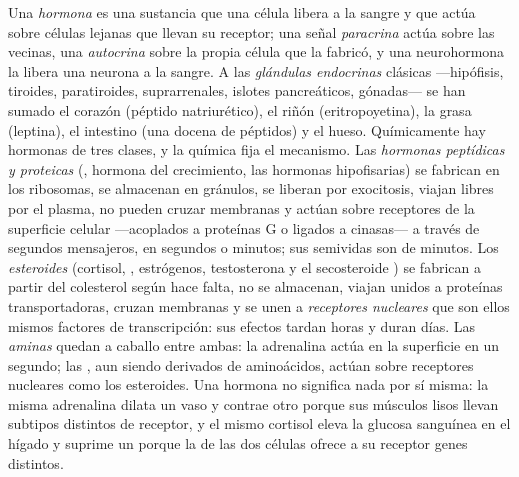 \begin{definition}[Hormona]\label{def:b3:endocrinology:hormone}
Una \emph{hormona} es una sustancia que una célula libera a la sangre y
que actúa sobre células lejanas que llevan su receptor; una señal
\emph{paracrina} actúa sobre las vecinas, una \emph{autocrina} sobre la
propia célula que la fabricó, y una neurohormona la libera una neurona
a la sangre. A las \emph{glándulas endocrinas} clásicas ---hipófisis,
tiroides, paratiroides, suprarrenales, islotes pancreáticos, gónadas---
se han sumado el corazón (péptido natriurético), el riñón
(eritropoyetina), la grasa (leptina), el intestino (una docena de
péptidos) y el hueso. Químicamente hay hormonas de tres clases, y la
química fija el mecanismo. Las \emph{hormonas peptídicas y proteicas}
(, hormona del crecimiento, las hormonas hipofisarias) se
fabrican en los ribosomas, se almacenan en gránulos, se liberan por
exocitosis, viajan libres por el plasma, no pueden cruzar membranas y
actúan sobre receptores de la superficie celular ---acoplados a
proteínas G o ligados a cinasas--- a través de segundos mensajeros, en
segundos o minutos; sus semividas son de minutos. Los \emph{esteroides}
(cortisol, , estrógenos, testosterona y el secosteroide
) se fabrican a partir del colesterol según hace falta, no se
almacenan, viajan unidos a proteínas transportadoras, cruzan membranas
y se unen a \emph{receptores nucleares} que son ellos mismos factores
de transcripción: sus efectos tardan horas y duran días. Las
\emph{aminas} quedan a caballo entre ambas: la adrenalina actúa en la
superficie en un segundo; las , aun siendo derivados
de aminoácidos, actúan sobre receptores nucleares como los esteroides.
Una hormona no significa nada por sí misma: la misma adrenalina dilata
un vaso y contrae otro porque sus músculos lisos llevan subtipos
distintos de receptor, y el mismo cortisol eleva la glucosa sanguínea
en el hígado y suprime un  porque la  de las dos
células ofrece a su receptor genes distintos.
\end{definition}

